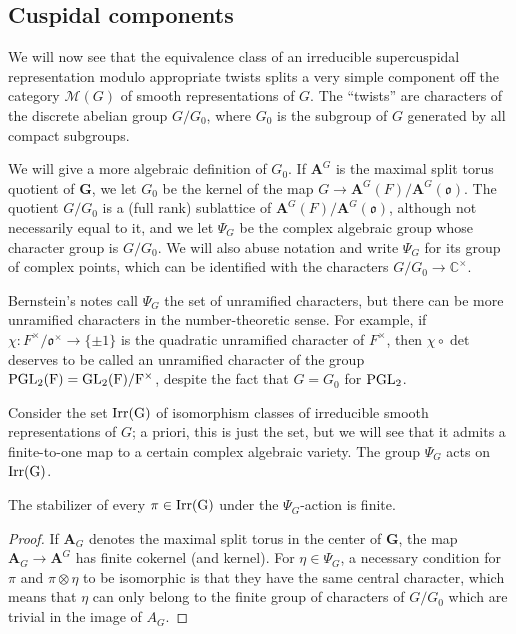 \subsection{Cuspidal components}
\label{subsection-cuspidal-components}

We will now see that the equivalence class of an irreducible supercuspidal representation modulo appropriate twists splits a very simple component off the category $\mathcal M(G)$ of smooth representations of $G$. The ``twists'' are characters of the discrete abelian group $G/G_0$, where $G_0$ is the subgroup of $G$ generated by all compact subgroups. 

We will give a more algebraic definition of $G_0$. If $\mathbf A^G$ is the maximal split torus quotient of $\mathbf G$, we let $G_0$ be the kernel of the map $G\to \mathbf A^G(F)/\mathbf A^G(\mathfrak o)$. The quotient $G/G_0$ is a (full rank) sublattice of $\mathbf A^G(F)/\mathbf A^G(\mathfrak o)$, although not necessarily equal to it, and we let $\Psi_G$ be the complex algebraic group whose character group is $G/G_0$. We will also abuse notation and write $\Psi_G$ for its group of complex points, which can be identified with the characters $G/G_0\to \mathbb C^\times$. 

\begin{remark}
	\label{remark-unramified-characters}
Bernstein's notes \cite{Bernstein-padic} call $\Psi_G$ the set of unramified characters, but there can be more unramified characters in the number-theoretic sense. For example, if $\chi:F^\times/\mathfrak o^\times\to \{\pm 1\}$ is the quadratic unramified character of $F^\times$, then $\chi\circ\det$ deserves to be called an unramified character of the group $\rm{PGL}_2(F)=\rm{GL}_2(F)/F^\times$, despite the fact that $G=G_0$ for $\rm{PGL}_2$. 
\end{remark}

Consider the set $\rm{Irr}(G)$ of isomorphism classes of irreducible smooth representations of $G$; a priori, this is just the set, but we will see that it admits a finite-to-one map to a certain complex algebraic variety. The group $\Psi_G$ acts on $\rm{Irr}(G)$.

\begin{lemma}
	\label{lemma-finite-stabilizer}
The stabilizer of every $\pi\in \rm{Irr}(G)$ under the $\Psi_G$-action is finite.	
\end{lemma}

\begin{proof}
	If $\mathbf A_G$ denotes the maximal split torus in the center of $\mathbf G$, the map $\mathbf A_G\to \mathbf A^G$ has finite cokernel (and kernel). For $\eta\in \Psi_G$, a necessary condition for $\pi$ and $\pi\otimes\eta$ to be isomorphic is that they have the same central character, which means that $\eta$ can only belong to the finite group of characters of $G/G_0$ which are trivial in the image of $A_G$. 
\end{proof}

